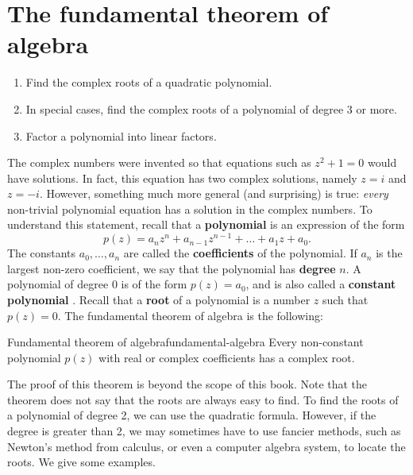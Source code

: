 \section{The fundamental theorem of algebra}

\begin{outcome}
  \begin{enumerate}
  \item Find the complex roots of a quadratic polynomial.
  \item In special cases, find the complex roots of a polynomial of
    degree 3 or more.
  \item Factor a polynomial into linear factors. 
  \end{enumerate}
\end{outcome}

The complex numbers were invented so that equations such as $z^2+1=0$
would have solutions. In fact, this equation has two complex
solutions, namely $z=i$ and $z=-i$. However, something much more
general (and surprising) is true: {\em every} non-trivial polynomial
equation has a solution in the complex numbers. To understand this
statement, recall that a \textbf{polynomial}%
 is an expression of the form
\begin{equation*}
  p(z) = a_nz^n + a_{n-1}z^{n-1} + \ldots + a_1z + a_0.
\end{equation*}
The constants $a_0,\ldots,a_n$ are called the \textbf{coefficients}%
%
 of the polynomial. If $a_n$ is the
largest non-zero coefficient, we say that the polynomial has
\textbf{degree}%
%
 $n$. A polynomial of degree $0$ is of the
form $p(z) = a_0$, and is also called a \textbf{constant polynomial}%
%
. Recall that a \textbf{root}%
%
 of a polynomial is a number $z$ such that
$p(z)=0$.  The fundamental theorem of algebra is the following:

\begin{theorem}{Fundamental theorem of algebra}{fundamental-algebra}
  Every non-constant polynomial $p(z)$ with real or complex
  coefficients has a complex root.
\end{theorem}

The proof of this theorem is beyond the scope of this book. Note that
the theorem does not say that the roots are always easy to find. To
find the roots of a polynomial of degree 2, we can use the quadratic
formula. However, if the degree is greater than 2, we may sometimes
have to use fancier methods, such as Newton's method from calculus, or
even a computer algebra system, to locate the roots. We give some
examples.

